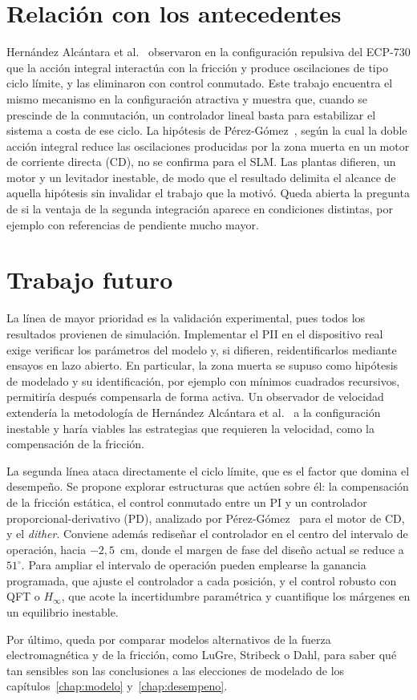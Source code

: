 \section{Relación con los antecedentes}

Hernández Alcántara et al.~\cite{alcantara} observaron en la configuración repulsiva del ECP-730 que la acción integral interactúa con la fricción y produce oscilaciones de tipo ciclo límite, y las eliminaron con control conmutado. Este trabajo encuentra el mismo mecanismo en la configuración atractiva y muestra que, cuando se prescinde de la conmutación, un controlador lineal basta para estabilizar el sistema a costa de ese ciclo. La hipótesis de Pérez-Gómez~\cite{perez}, según la cual la doble acción integral reduce las oscilaciones producidas por la zona muerta en un motor de corriente directa (CD), no se confirma para el SLM. Las plantas difieren, un motor y un levitador inestable, de modo que el resultado delimita el alcance de aquella hipótesis sin invalidar el trabajo que la motivó. Queda abierta la pregunta de si la ventaja de la segunda integración aparece en condiciones distintas, por ejemplo con referencias de pendiente mucho mayor.

\section{Trabajo futuro}

La línea de mayor prioridad es la validación experimental, pues todos los resultados provienen de simulación. Implementar el PII en el dispositivo real exige verificar los parámetros del modelo y, si difieren, reidentificarlos mediante ensayos en lazo abierto. En particular, la zona muerta se supuso como hipótesis de modelado y su identificación, por ejemplo con mínimos cuadrados recursivos, permitiría después compensarla de forma activa. Un observador de velocidad extendería la metodología de Hernández Alcántara et al.~\cite{alcantara} a la configuración inestable y haría viables las estrategias que requieren la velocidad, como la compensación de la fricción.

La segunda línea ataca directamente el ciclo límite, que es el factor que domina el desempeño. Se propone explorar estructuras que actúen sobre él: la compensación de la fricción estática, el control conmutado entre un PI y un controlador proporcional-derivativo (PD), analizado por Pérez-Gómez~\cite{perez} para el motor de CD, y el \emph{dither}. Conviene además rediseñar el controlador en el centro del intervalo de operación, hacia $-2{,}5$~cm, donde el margen de fase del diseño actual se reduce a $51^\circ$. Para ampliar el intervalo de operación pueden emplearse la ganancia programada, que ajuste el controlador a cada posición, y el control robusto con QFT o $H_\infty$, que acote la incertidumbre paramétrica y cuantifique los márgenes en un equilibrio inestable.

Por último, queda por comparar modelos alternativos de la fuerza electromagnética y de la fricción, como LuGre, Stribeck o Dahl, para saber qué tan sensibles son las conclusiones a las elecciones de modelado de los capítulos~\ref{chap:modelo} y~\ref{chap:desempeno}.
